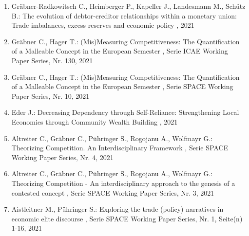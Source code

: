 \begin{enumerate}[leftmargin=*, labelsep=0.5cm]
	 \item Gräbner-Radkowitsch C., Heimberger P., Kapeller J., Landesmann M., Schütz B.:  The evolution of debtor-creditor relationships within a monetary union: Trade imbalances, excess reserves and economic policy  , 2021
	 \item Gräbner C., Hager T.:  (Mis)Measuring Competitiveness: The Quantification of a Malleable Concept in the European Semester  , Serie ICAE Working Paper Series, Nr. 130, 2021
	 \item Gräbner C., Hager T.:  (Mis)Measuring Competitiveness: The Quantification of a Malleable Concept in the European Semester  , Serie SPACE Working Paper Series, Nr. 10, 2021
	 \item Eder J.:  Decreasing Dependency through Self-Reliance: Strengthening Local Economies through Community Wealth Building  , 2021
	 \item Altreiter C., Gräbner C., Pühringer S., Rogojanu A., Wolfmayr G.:  Theorizing Competition. An Interdisciplinary Framework  , Serie SPACE Working Paper Series, Nr. 4, 2021
	 \item Altreiter C., Gräbner C., Pühringer S., Rogojanu A., Wolfmayr G.:  Theorizing Competition - An interdisciplinary approach to the genesis of a contested concept  , Serie SPACE Working Paper Series, Nr. 3, 2021
	 \item Aistleitner M., Pühringer S.:  Exploring the trade (policy) narratives in economic elite discourse  , Serie SPACE Working Paper Series, Nr. 1, Seite(n) 1-16, 2021
\end{enumerate} 
